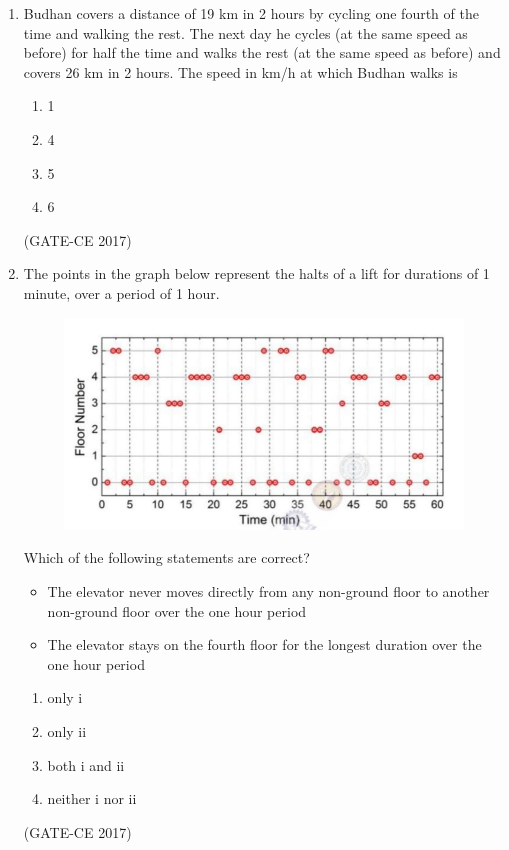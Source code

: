 \documentclass[journal,12pt,onecolumn]{article}
\theoremstyle{remark}
\begin{document}
\begin{enumerate}
    \item Budhan covers a distance of 19 km in 2 hours by cycling one fourth of the time and walking the rest. The next day he cycles (at the same speed as before) for half the time and walks the rest (at the same speed as before) and covers 26 km in 2 hours. The speed in km/h at which Budhan walks is
    \begin{multicols}{4}
    \begin{enumerate}
        \item 1  
        \item 4  
        \item 5  
        \item 6  
    \end{enumerate}
    \end{multicols}
    \hfill (GATE-CE 2017)

    \item The points in the graph  below represent the halts of a lift for durations of 1 minute, over a period of 1 hour.
    \begin{figure}[H]
    \centering
    \includegraphics[width=0.7\columnwidth]{figs/q65.jpg}  
    \caption{}
    \label{fig:14}
    \end{figure}
    Which of the following statements are correct?
    \begin{itemize}
        \item The elevator never moves directly from any non-ground floor to another non-ground floor over the one hour period  
        \item The elevator stays on the fourth floor for the longest duration over the one hour period  
    \end{itemize}
    \begin{multicols}{2}
    \begin{enumerate}
        \item only i
        \item only ii
        \item both i and ii
        \item neither i nor ii
    \end{enumerate}
    \end{multicols}
    \hfill (GATE-CE 2017)

\end{enumerate}
\end{document}
